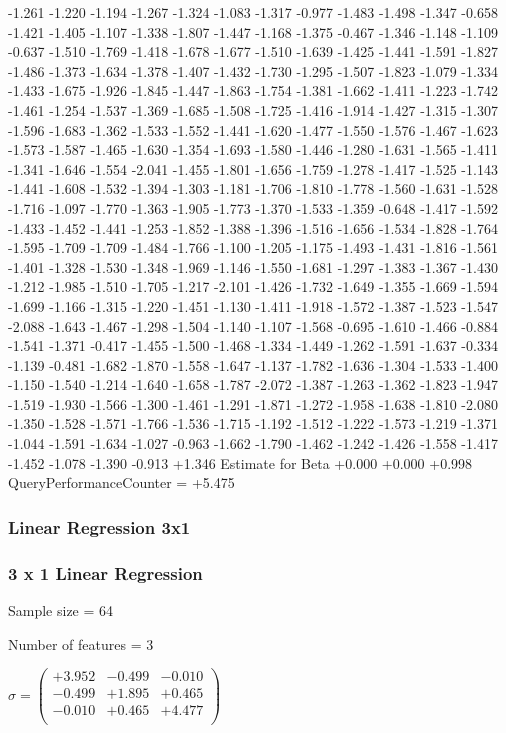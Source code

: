 \documentclass[9pt]{article}
\theoremstyle{plain}
\theoremstyle{definition}
\theoremstyle{remark}
\numberwithin{equation}{section}
\begin{document}
-1.261
-1.220
-1.194
-1.267
-1.324
-1.083
-1.317
-0.977
-1.483
-1.498
-1.347
-0.658
-1.421
-1.405
-1.107
-1.338
-1.807
-1.447
-1.168
-1.375
-0.467
-1.346
-1.148
-1.109
-0.637
-1.510
-1.769
-1.418
-1.678
-1.677
-1.510
-1.639
-1.425
-1.441
-1.591
-1.827
-1.486
-1.373
-1.634
-1.378
-1.407
-1.432
-1.730
-1.295
-1.507
-1.823
-1.079
-1.334
-1.433
-1.675
-1.926
-1.845
-1.447
-1.863
-1.754
-1.381
-1.662
-1.411
-1.223
-1.742
-1.461
-1.254
-1.537
-1.369
-1.685
-1.508
-1.725
-1.416
-1.914
-1.427
-1.315
-1.307
-1.596
-1.683
-1.362
-1.533
-1.552
-1.441
-1.620
-1.477
-1.550
-1.576
-1.467
-1.623
-1.573
-1.587
-1.465
-1.630
-1.354
-1.693
-1.580
-1.446
-1.280
-1.631
-1.565
-1.411
-1.341
-1.646
-1.554
-2.041
-1.455
-1.801
-1.656
-1.759
-1.278
-1.417
-1.525
-1.143
-1.441
-1.608
-1.532
-1.394
-1.303
-1.181
-1.706
-1.810
-1.778
-1.560
-1.631
-1.528
-1.716
-1.097
-1.770
-1.363
-1.905
-1.773
-1.370
-1.533
-1.359
-0.648
-1.417
-1.592
-1.433
-1.452
-1.441
-1.253
-1.852
-1.388
-1.396
-1.516
-1.656
-1.534
-1.828
-1.764
-1.595
-1.709
-1.709
-1.484
-1.766
-1.100
-1.205
-1.175
-1.493
-1.431
-1.816
-1.561
-1.401
-1.328
-1.530
-1.348
-1.969
-1.146
-1.550
-1.681
-1.297
-1.383
-1.367
-1.430
-1.212
-1.985
-1.510
-1.705
-1.217
-2.101
-1.426
-1.732
-1.649
-1.355
-1.669
-1.594
-1.699
-1.166
-1.315
-1.220
-1.451
-1.130
-1.411
-1.918
-1.572
-1.387
-1.523
-1.547
-2.088
-1.643
-1.467
-1.298
-1.504
-1.140
-1.107
-1.568
-0.695
-1.610
-1.466
-0.884
-1.541
-1.371
-0.417
-1.455
-1.500
-1.468
-1.334
-1.449
-1.262
-1.591
-1.637
-0.334
-1.139
-0.481
-1.682
-1.870
-1.558
-1.647
-1.137
-1.782
-1.636
-1.304
-1.533
-1.400
-1.150
-1.540
-1.214
-1.640
-1.658
-1.787
-2.072
-1.387
-1.263
-1.362
-1.823
-1.947
-1.519
-1.930
-1.566
-1.300
-1.461
-1.291
-1.871
-1.272
-1.958
-1.638
-1.810
-2.080
-1.350
-1.528
-1.571
-1.766
-1.536
-1.715
-1.192
-1.512
-1.222
-1.573
-1.219
-1.371
-1.044
-1.591
-1.634
-1.027
-0.963
-1.662
-1.790
-1.462
-1.242
-1.426
-1.558
-1.417
-1.452
-1.078
-1.390
-0.913
+1.346
Estimate for Beta
+0.000
+0.000
+0.998
QueryPerformanceCounter  =  +5.475
\subsubsection{Linear Regression 3x1}
\subsubsection{3 x 1 Linear Regression}
Sample size = 64

Number of features = 3

$\sigma = \left(
\begin{array}{
ccc}
+3.952 & -0.499 & -0.010 \\
-0.499 & +1.895 & +0.465 \\
-0.010 & +0.465 & +4.477 \\
\end{array}
\right)$ \newline 
\end{document}
